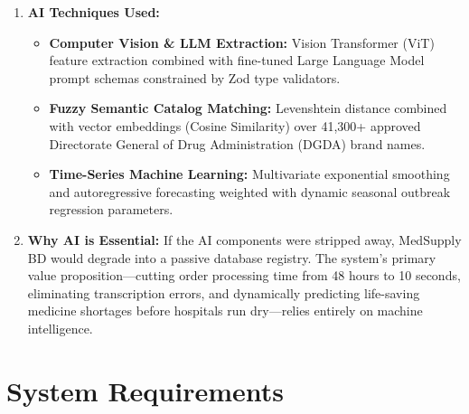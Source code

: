 \documentclass[12pt,a4paper]{article}
\begin{document}
\begin{enumerate}
\begin{itemize}
        \begin{itemize}
            \item \textit{Input:} Depleted or out-of-stock medicine ID.
            \item \textit{Output:} Ranked list of exact therapeutic chemical alternatives in active stock, complete with price variance analysis.
            \item \textit{Replaced Manual Work:} Prevents lost sales and eliminates manual cross-referencing of thick pharmaceutical formularies.
        \end{itemize}
    \end{itemize}
    \item \textbf{AI Techniques Used:}
    \begin{itemize}
        \item \textbf{Computer Vision \& LLM Extraction:} Vision Transformer (ViT) feature extraction combined with fine-tuned Large Language Model prompt schemas constrained by Zod type validators.
        \item \textbf{Fuzzy Semantic Catalog Matching:} Levenshtein distance combined with vector embeddings (Cosine Similarity) over 41,300+ approved Directorate General of Drug Administration (DGDA) brand names.
        \item \textbf{Time-Series Machine Learning:} Multivariate exponential smoothing and autoregressive forecasting weighted with dynamic seasonal outbreak regression parameters.
    \end{itemize}
    \item \textbf{Why AI is Essential:} If the AI components were stripped away, MedSupply BD would degrade into a passive database registry. The system's primary value proposition---cutting order processing time from 48 hours to 10 seconds, eliminating transcription errors, and dynamically predicting life-saving medicine shortages before hospitals run dry---relies entirely on machine intelligence.
\end{enumerate}

\section{System Requirements}
\end{document}
